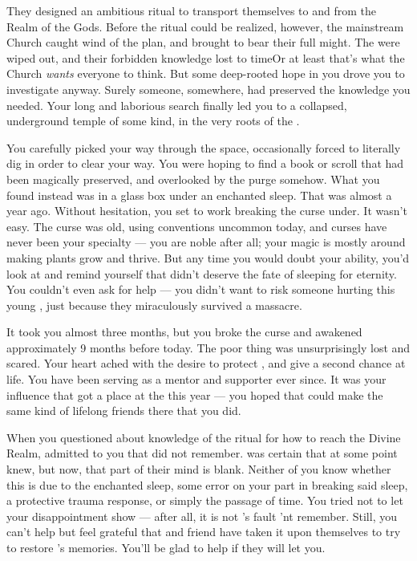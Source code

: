 \documentclass[char]{GL2020}
\begin{document}
They designed an ambitious ritual to transport themselves to and from the Realm of the Gods. Before the ritual could be realized, however, the mainstream Church caught wind of the plan, and brought to bear their full might. The \cDisneySect{} were wiped out, and their forbidden knowledge lost to time\Idots Or at least that’s what the Church \emph{wants} everyone to think. But some deep-rooted hope in you drove you to investigate anyway. Surely someone, somewhere, had preserved the knowledge you needed. Your long and laborious search finally led you to a collapsed, underground temple of some kind, in the very roots of the \pSpine{}. 

You carefully picked your way through the space, occasionally forced to literally dig in order to clear your way. You were hoping to find a book or scroll that had been magically preserved, and overlooked by the purge somehow. What you found instead was \cDisney{\full} in a glass box under an enchanted sleep. That was almost a year ago. Without hesitation, you set to work breaking the curse \cDisney{\they} \cDisney{\were} under. It wasn’t easy. The curse was old, using conventions uncommon today, and curses have never been your specialty — you are noble after all; your magic is mostly around making plants grow and thrive. But any time you would doubt your ability, you’d look at \cDisney{} and remind yourself that \cDisney{\they} didn’t deserve the fate of sleeping for eternity. You couldn’t even ask for help — you didn’t want to risk someone hurting this young \cDisney{\person}, just because they miraculously survived a massacre.

It took you almost three months, but you broke the curse and awakened \cDisney{} approximately 9 months before today. The poor thing was unsurprisingly lost and scared. Your heart ached with the desire to protect \cDisney{\them}, and give \cDisney{\them} a second chance at life. You have been serving as a mentor and supporter ever since. It was your influence that got \cDisney{} a place at the \pSchool{} this year — you hoped that \cDisney{} could make the same kind of lifelong friends there that you did.

When you questioned \cDisney{} about \cDisney{\their} knowledge of the ritual for how to reach the Divine Realm, \cDisney{\they} admitted to you that \cDisney{\they} did not remember. \cDisney{} was certain that at some point \cDisney{\they} knew, but now, that part of their mind is blank. Neither of you know whether this is due to the enchanted sleep, some error on your part in breaking said sleep, a protective trauma response, or simply the passage of time. You tried not to let your disappointment show — after all, it is not \cDisney{}’s fault \cDisney{\they} \cDisney{\do}’nt remember. Still, you can’t help but feel grateful that \cDisney{} and \cDisney{\their} friend \cTechStar{} have taken it upon themselves to try to restore \cDisney{}’s memories. You’ll be glad to help if they will let you.
\end{document}
